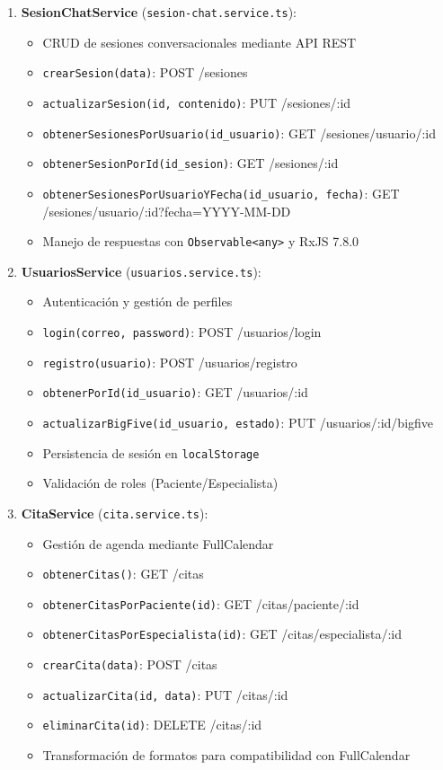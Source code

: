 \documentclass[12pt,a4paper]{report}
\numberwithin{figure}{section}
\begin{document}
\begin{enumerate}
  \item \textbf{SesionChatService} (\texttt{sesion-chat.service.ts}):
  \begin{itemize}
    \item CRUD de sesiones conversacionales mediante API REST
    \item \texttt{crearSesion(data)}: POST /sesiones
    \item \texttt{actualizarSesion(id, contenido)}: PUT /sesiones/:id
    \item \texttt{obtenerSesionesPorUsuario(id\_usuario)}: GET /sesiones/usuario/:id
    \item \texttt{obtenerSesionPorId(id\_sesion)}: GET /sesiones/:id
    \item \texttt{obtenerSesionesPorUsuarioYFecha(id\_usuario, fecha)}: GET /sesiones/usuario/:id?fecha=YYYY-MM-DD
    \item Manejo de respuestas con \texttt{Observable<any>} y RxJS 7.8.0
  \end{itemize}
  
  \item \textbf{UsuariosService} (\texttt{usuarios.service.ts}):
  \begin{itemize}
    \item Autenticación y gestión de perfiles
    \item \texttt{login(correo, password)}: POST /usuarios/login
    \item \texttt{registro(usuario)}: POST /usuarios/registro
    \item \texttt{obtenerPorId(id\_usuario)}: GET /usuarios/:id
    \item \texttt{actualizarBigFive(id\_usuario, estado)}: PUT /usuarios/:id/bigfive
    \item Persistencia de sesión en \texttt{localStorage}
    \item Validación de roles (Paciente/Especialista)
  \end{itemize}
  
  \item \textbf{CitaService} (\texttt{cita.service.ts}):
  \begin{itemize}
    \item Gestión de agenda mediante FullCalendar
    \item \texttt{obtenerCitas()}: GET /citas
    \item \texttt{obtenerCitasPorPaciente(id)}: GET /citas/paciente/:id
    \item \texttt{obtenerCitasPorEspecialista(id)}: GET /citas/especialista/:id
    \item \texttt{crearCita(data)}: POST /citas
    \item \texttt{actualizarCita(id, data)}: PUT /citas/:id
    \item \texttt{eliminarCita(id)}: DELETE /citas/:id
    \item Transformación de formatos para compatibilidad con FullCalendar
  \end{itemize}
  

\end{enumerate}
\end{document}
